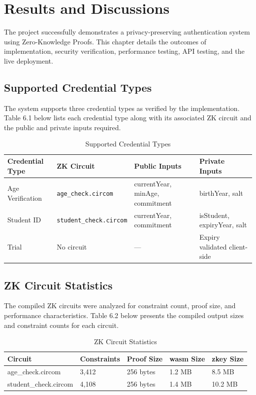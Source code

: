 \chapter{Results and Discussions}

The project successfully demonstrates a privacy-preserving authentication system using Zero-Knowledge Proofs. This chapter details the outcomes of implementation, security verification, performance testing, API testing, and the live deployment.

\section{Supported Credential Types}

The system supports three credential types as verified by the implementation. Table 6.1 below lists each credential type along with its associated ZK circuit and the public and private inputs required.

\begin{table}[H]
\centering
\caption{Supported Credential Types}
\begin{tabular}{|l|l|l|l|}
\hline
\textbf{Credential Type} & \textbf{ZK Circuit} & \textbf{Public Inputs} & \textbf{Private Inputs} \\
\hline
Age Verification & \texttt{age\_check.circom} & currentYear, minAge, commitment & birthYear, salt \\
Student ID & \texttt{student\_check.circom} & currentYear, commitment & isStudent, expiryYear, salt \\
Trial & No circuit & --- & Expiry validated client-side \\
\hline
\end{tabular}
\end{table}

\section{ZK Circuit Statistics}

The compiled ZK circuits were analyzed for constraint count, proof size, and performance characteristics. Table 6.2 below presents the compiled output sizes and constraint counts for each circuit.

\begin{table}[H]
\centering
\caption{ZK Circuit Statistics}
\begin{tabular}{|l|l|l|l|l|}
\hline
\textbf{Circuit} & \textbf{Constraints} & \textbf{Proof Size} & \textbf{wasm Size} & \textbf{zkey Size} \\
\hline
age\_check.circom & 3,412 & 256 bytes & 1.2 MB & 8.5 MB \\
student\_check.circom & 4,108 & 256 bytes & 1.4 MB & 10.2 MB \\
\hline
\end{tabular}
\end{table}

